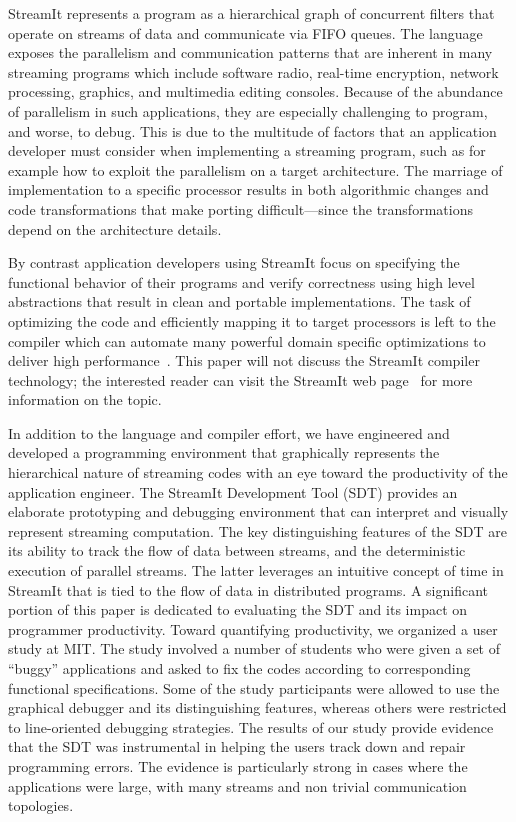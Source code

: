 \documentclass[11pt, letterpaper, onecolumn]{article}
\begin{document}
StreamIt represents  a program as  a hierarchical graph  of concurrent
filters  that operate  on streams  of  data and  communicate via  FIFO
queues.    The  language  exposes   the     parallelism  and
communication patterns  that are  inherent in many  streaming programs
which   include   software   radio,  real-time   encryption,   network
processing, graphics, and multimedia editing consoles.  Because of the
abundance  of parallelism  in such  applications, they  are especially
challenging  to program,  and worse,  to debug.   This is  due  to the
multitude of factors that  an application developer must consider when
implementing a streaming  program, such as for example  how to exploit
the   parallelism  on   a  target   architecture.   The   marriage  of
implementation  to a  specific processor  results in  both algorithmic
changes and  code transformations that  make porting difficult---since
the transformations depend on the architecture details.

By contrast application developers  using StreamIt focus on specifying
the functional behavior of their programs and verify correctness using
high   level  abstractions   that   result  in   clean  and   portable
implementations.   The task  of  optimizing the  code and  efficiently
mapping  it to target  processors is  left to  the compiler  which can
automate many  powerful domain specific optimizations  to deliver high
performance~\cite{streambit, linear}. This  paper will not discuss the
StreamIt  compiler technology;  the  interested reader  can visit  the
StreamIt  web  page~\cite{streamit-web} for  more  information on  the
topic.

In addition  to the language  and compiler effort, we  have engineered
and  developed a programming  environment that  graphically represents
the  hierarchical nature  of streaming  codes with  an eye  toward the
productivity  of the application  engineer.  The  StreamIt Development
Tool (SDT) provides an elaborate prototyping and debugging environment
that can  interpret and visually represent  streaming computation. The
key distinguishing  features of the SDT  are its ability  to track the
flow  of data  between  streams, and  the  deterministic execution  of
parallel streams. The latter leverages an intuitive concept of time in
StreamIt that is  tied to the flow of data  in distributed programs. A
significant portion of  this paper is dedicated to  evaluating the SDT
and  its   impact  on  programmer   productivity.  Toward  quantifying
productivity, we organized  a user study at MIT.  The study involved a
number of students who were  given a set of ``buggy'' applications and
asked  to   fix  the  codes  according   to  corresponding  functional
specifications. Some of the study participants were allowed to use the
graphical  debugger and  its distinguishing  features,  whereas others
were restricted to line-oriented  debugging strategies. The results of
our study  provide evidence that  the SDT was instrumental  in helping
the users  track down and  repair programming errors. The  evidence is
particularly strong  in cases where the applications  were large, with
many streams and non trivial communication topologies.
\end{document}
